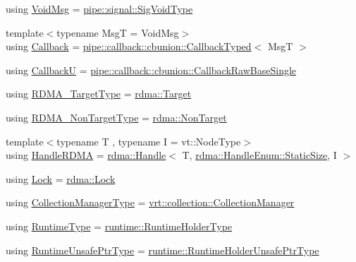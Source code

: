 \begin{DoxyCompactItemize}
using \hyperlink{namespacevt_ae108c204035ac2513c8d09e6971a4a31}{Void\+Msg} = \hyperlink{namespacevt_1_1pipe_1_1signal_acbe257d1ae44f20fa9fd9b6ed3057caf}{pipe\+::signal\+::\+Sig\+Void\+Type}
\item 
{\footnotesize template$<$typename MsgT  = Void\+Msg$>$ }\\using \hyperlink{namespacevt_a36db99df4c973d48b1118a293fff533f}{Callback} = \hyperlink{structvt_1_1pipe_1_1callback_1_1cbunion_1_1_callback_typed}{pipe\+::callback\+::cbunion\+::\+Callback\+Typed}$<$ MsgT $>$
\item 
using \hyperlink{namespacevt_af79a43a97bc3593fc349f086c874c48e}{CallbackU} = \hyperlink{structvt_1_1pipe_1_1callback_1_1cbunion_1_1_callback_raw_base_single}{pipe\+::callback\+::cbunion\+::\+Callback\+Raw\+Base\+Single}
\item 
using \hyperlink{namespacevt_a9bf03a57102d0274cc229b9ef94bb59e}{R\+D\+M\+A\+\_\+\+Target\+Type} = \hyperlink{structvt_1_1rdma_1_1_target}{rdma\+::\+Target}
\item 
using \hyperlink{namespacevt_ae5bd2866e5ee83f4d6a53e8730cd3202}{R\+D\+M\+A\+\_\+\+Non\+Target\+Type} = \hyperlink{structvt_1_1rdma_1_1_non_target}{rdma\+::\+Non\+Target}
\item 
{\footnotesize template$<$typename T , typename I  = vt\+::\+Node\+Type$>$ }\\using \hyperlink{namespacevt_abc3449a4b87363b942453d0b8cc18a7d}{Handle\+R\+D\+MA} = \hyperlink{structvt_1_1rdma_1_1_handle}{rdma\+::\+Handle}$<$ T, \hyperlink{namespacevt_1_1rdma_a0234ff19cfb3c04718cfdfd36b2d6d88a0c5c41d6a0319a61d3a5e8a060b7c4d7}{rdma\+::\+Handle\+Enum\+::\+Static\+Size}, I $>$
\item 
using \hyperlink{namespacevt_ae3eb725d1ffe20cd7d82a8c42f3e52ef}{Lock} = \hyperlink{namespacevt_1_1rdma_ac5c20b41a653e520b6305d4d454ecb70}{rdma\+::\+Lock}
\item 
using \hyperlink{namespacevt_a290f7e8941f9f411b54cdb15b6cea107}{Collection\+Manager\+Type} = \hyperlink{structvt_1_1vrt_1_1collection_1_1_collection_manager}{vrt\+::collection\+::\+Collection\+Manager}
\item 
using \hyperlink{namespacevt_a5c1db2c048b259a2ba8961766ddb9278}{Runtime\+Type} = \hyperlink{namespacevt_1_1runtime_ab09d044cce417fbcdb7e1e29b7aabbc3}{runtime\+::\+Runtime\+Holder\+Type}
\item 
using \hyperlink{namespacevt_a8019b70cc4b9b0833c38559c85dfd53b}{Runtime\+Unsafe\+Ptr\+Type} = \hyperlink{namespacevt_1_1runtime_a69931905b04961a874e4a70a43083a83}{runtime\+::\+Runtime\+Holder\+Unsafe\+Ptr\+Type}

\end{DoxyCompactItemize}
